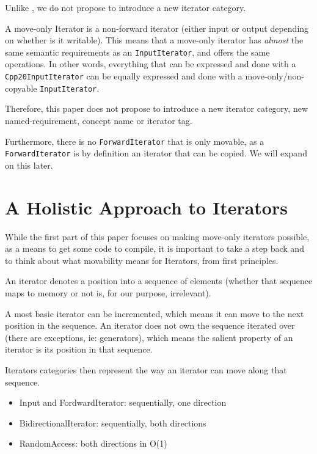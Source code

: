 \documentclass{wg21}
\begin{document}
Unlike \cite{P0902}, we do not propose to introduce a new
iterator category.

A move-only Iterator is a non-forward iterator (either input or output
depending on whether is it writable). This means that a move-only
iterator has \emph{almost} the same semantic requirements as an
\texttt{InputIterator}, and offers the same operations. In other words,
everything that can be expressed and done with a
\texttt{Cpp20InputIterator} can be equally expressed and done with a
move-only/non-copyable \texttt{InputIterator}.

Therefore, this paper does not propose to introduce a new iterator
category, new named-requirement, concept name or iterator tag.

Furthermore, there is no \texttt{ForwardIterator} that is only movable,
as a \texttt{ForwardIterator} is by definition an iterator that can be
copied. We will expand on this later.

\hypertarget{a-holistic-approach-to-iterators}{%
	\section{A Holistic Approach to
		Iterators}\label{a-holistic-approach-to-iterators}}

While the first part of this paper focuses on making move-only iterators
possible, as a means to get some code to compile, it is important to
take a step back and to think about what movability means for Iterators,
from first principles.

An iterator denotes a position into a sequence of elements (whether that
sequence maps to memory or not is, for our purpose, irrelevant).

A most basic iterator can be incremented, which means it can move to the
next position in the sequence. An iterator does not own the sequence
iterated over (there are exceptions, ie: generators), which means the
salient property of an iterator is its position in that sequence.

Iterators categories then represent the way an iterator can move along
that sequence. 
\begin{itemize}
	\item Input and FordwardIterator: sequentially, one direction
	\item BidirectionalIterator: sequentially, both directions
	\item RandomAccess: both directions in O(1)
\end{itemize}
\end{document}
